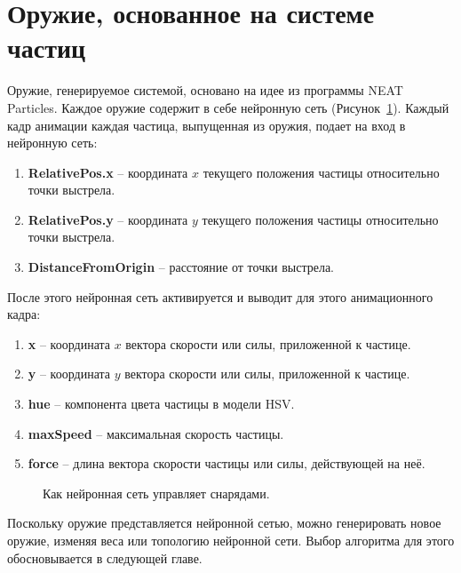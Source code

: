 ﻿%
\section{Оружие, основанное на системе частиц}\label{sec:WeaponIdea}

Оружие, генерируемое системой, основано на идее из программы NEAT Particles\cite{s2,s3}. Каждое оружие содержит в себе нейронную сеть (Рисунок~\ref{Weapon}). Каждый кадр анимации каждая частица, выпущенная из оружия, подает на вход в нейронную сеть:

\begin{enumerate}
    \item {\small \textbf{RelativePos.x}} -- координата $x$ текущего положения частицы относительно точки выстрела.
    \item {\small \textbf{RelativePos.y}} -- координата $y$ текущего положения частицы относительно точки выстрела.
    \item {\small \textbf{DistanceFromOrigin}} -- расстояние от точки выстрела.
\end{enumerate}

После этого нейронная сеть активируется и выводит для этого анимационного кадра:

\begin{enumerate}
    \item {\small \textbf{x}} -- координата $x$ вектора скорости или силы, приложенной к частице.
    \item {\small \textbf{y}} -- координата $y$ вектора скорости или силы, приложенной к частице.
    \item {\small \textbf{hue}} -- компонента цвета частицы в модели HSV\@.
    \item {\small \textbf{maxSpeed}} -- максимальная скорость частицы.
    \item {\small \textbf{force}} -- длина вектора скорости частицы или силы, действующей на неё.
\end{enumerate}


\begin{figure}[ht]
    \begin{center}

        \caption{
            \label{Weapon}
            Как нейронная сеть управляет снарядами.}
    \end {center}
\end {figure}


Поскольку оружие представляется нейронной сетью, можно генерировать новое оружие, изменяя веса или топологию нейронной сети. Выбор алгоритма для этого обосновывается в следующей главе.

